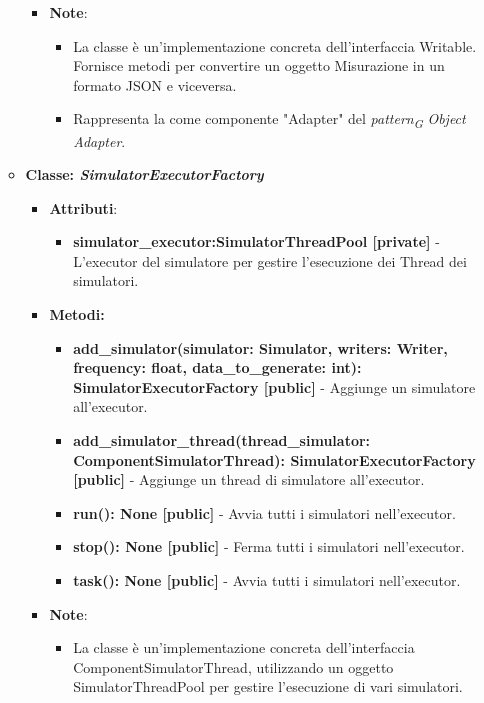 \begin{itemize}
\begin{itemize}
\begin{itemize}
\begin{itemize}
    \end{itemize}
    \item\textbf{Note}:
        \begin{itemize}
            \item La classe è un'implementazione concreta dell'interfaccia Writable. Fornisce metodi per convertire un oggetto Misurazione in un formato JSON e viceversa.
            \item Rappresenta la come componente "Adapter" del \textit{pattern}\textsubscript{\textit{G}} \textit{Object Adapter}.
        \end{itemize}
    \end{itemize}
    \item{\textbf{Classe: \textit{SimulatorExecutorFactory}}}
    \begin{itemize}
    \item\textbf{Attributi}:
        \begin{itemize}
        \item \textbf{simulator\_executor:SimulatorThreadPool [private]} - L'executor del simulatore per gestire l'esecuzione dei Thread dei simulatori.
    \end{itemize}
    \item \textbf{Metodi: }
    \begin{itemize}
        \item \textbf{add\_simulator(simulator: Simulator, writers: Writer, frequency: float, data\_to\_generate: int): SimulatorExecutorFactory [public]} - Aggiunge un simulatore all'executor.
        \item \textbf{add\_simulator\_thread(thread\_simulator: ComponentSimulatorThread): SimulatorExecutorFactory [public]} - Aggiunge un thread di simulatore all'executor.
        \item \textbf{run(): None [public]} - Avvia tutti i simulatori nell'executor.
        \item \textbf{stop(): None [public]} - Ferma tutti i simulatori nell'executor.
        \item \textbf{task(): None [public]} - Avvia tutti i simulatori nell'executor.
    \end{itemize}
    \item\textbf{Note}:
        \begin{itemize}
            \item La classe è un'implementazione concreta dell'interfaccia ComponentSimulatorThread, utilizzando un oggetto SimulatorThreadPool per gestire l'esecuzione di vari simulatori.

\end{itemize}
\end{itemize}
\end{itemize}
\end{itemize}
